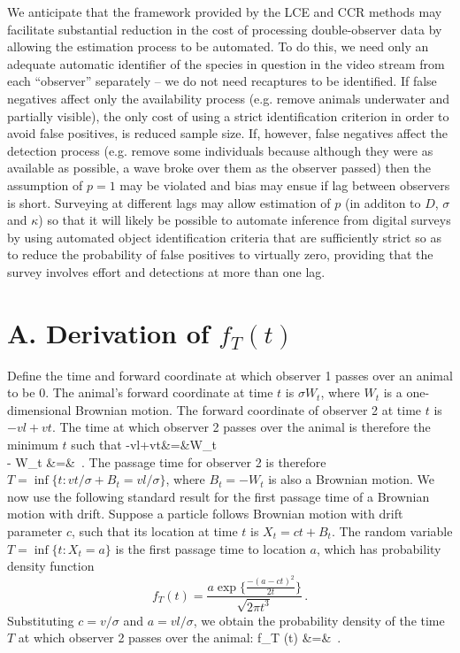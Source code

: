 \documentclass[useAMS, usenatbib, referee]{biom}\usepackage[]{graphicx}\usepackage[]{color}
\begin{document}
We anticipate that the framework provided by the LCE and CCR methods may facilitate substantial reduction in the cost of processing double-observer data by allowing the estimation process to be automated. To do this, we need only an adequate automatic identifier of the species in question in the video stream from each ``observer'' separately -- we do not need recaptures to be identified. If false negatives affect only the availability process (e.g. remove animals underwater and partially visible), the only cost of using a strict identification criterion in order to avoid false positives, is reduced sample size. If, however, false negatives affect the detection process (e.g. remove some individuals because although they were as available as possible, a wave broke over them as the observer passed) then the assumption of $p=1$ may be violated and bias may ensue if lag between observers is short. Surveying at different lags may allow estimation of $p$ (in additon to $D$, $\sigma$ and $\kappa$) so that it will likely be possible to automate inference from digital surveys by using automated object identification criteria that are sufficiently strict so as to reduce the probability of false positives to virtually zero, providing that the survey involves effort and detections at more than one lag.


\appendix

\section{A. Derivation of $f_{T}(t)$}
\label{appx:firstpassage}

Define the time and forward coordinate at which observer 1 passes over an animal to be 0. The animal's forward coordinate at time $t$ is $\sigma W_t$, where $W_t$ is a one-dimensional Brownian motion. The forward coordinate of observer 2 at time $t$ is $-vl+vt$. The time at which observer 2 passes over the animal is therefore the minimum $t$ such that
\be
-vl+vt&=&\sigma W_t \nonumber \\
\Rightarrow \;\;\; - W_t &=& \,.
\ee
\noindent
The passage time for observer 2 is therefore $T=\inf\{t: vt/\sigma + B_t = vl/\sigma\}$, where $B_t=-W_t$ is also a Brownian motion. We now use the following standard result for the first passage time of a Brownian motion with drift. Suppose a particle follows Brownian motion with drift parameter $c$, such that its location at time $t$ is $X_t=ct+B_t$. The random variable $T=\inf\{t: X_t=a\}$ is the first passage time to location $a$, which has probability density function
\begin{equation}
f_{T} (t) = \frac{ a \exp \Big\{ \frac{- (a-ct)^2}{2t} \Big\} }{\sqrt{2 \pi t^3}}\,.
\end{equation}
\noindent
Substituting $c=v/\sigma$ and $a=vl/\sigma$, we obtain the probability density of the time $T$ at which observer 2 passes over the animal:
\be
f_{T} (t)
&=&
\,.
\ee
\end{document}
